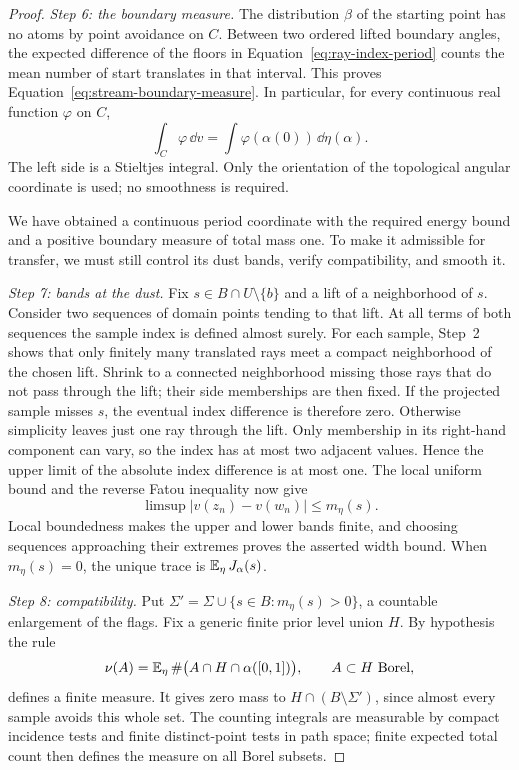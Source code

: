 \begin{proof}
\smallskip\noindent\emph{Step 6: the boundary measure.}
The distribution $\beta$ of the starting point has no atoms by point
avoidance on $C$.  Between two ordered lifted boundary angles, the
expected difference of the floors in
Equation~\eqref{eq:ray-index-period} counts the mean number of start
translates in that interval.  This proves
Equation~\eqref{eq:stream-boundary-measure}.  In particular, for every
continuous real function $\varphi$ on $C$,
\begin{equation}\label{eq:stream-boundary-integral}
 \int_C\varphi\,\dd v
   =\int\varphi(\alpha(0))\,\dd\eta(\alpha).
\end{equation}
The left side is a Stieltjes integral.  Only the orientation of the
topological angular coordinate is used; no smoothness is required.

We have obtained a continuous period coordinate with the required
energy bound and a positive boundary measure of total mass one.  To
make it admissible for transfer, we must still control its dust bands,
verify compatibility, and smooth it.

\smallskip\noindent\emph{Step 7: bands at the dust.}
Fix $s\in B\cap U\setminus\{b\}$ and a lift of a neighborhood of
$s$.  Consider two sequences of domain points tending to that lift.
At all terms of both sequences the sample index is defined almost
surely. For each sample, Step~2 shows that only finitely many translated
rays meet a compact neighborhood of the chosen lift. Shrink to a connected
neighborhood missing those rays that do not pass through the lift; their
side memberships are then fixed. If the projected sample misses $s$,
the eventual index difference is therefore zero. Otherwise simplicity
leaves just one ray through the lift. Only membership in its right-hand
component can vary, so the index has at most two adjacent values. Hence
the upper limit of the absolute index difference is at most one.
The local uniform bound and the reverse Fatou inequality now give
\[
 \limsup |v(z_n)-v(w_n)|\le m_\eta(s).
\]
Local boundedness makes the upper and lower bands finite, and choosing
sequences approaching their extremes proves the asserted width bound.
When $m_\eta(s)=0$, the unique trace is $\operatorname{\mathbb E}_\eta J_\alpha(s)$.

\smallskip\noindent\emph{Step 8: compatibility.}
Put $\Sigma'=\Sigma\cup\{s\in B:m_\eta(s)>0\}$, a countable
enlargement of the flags.  Fix a generic finite prior level union $H$.
By hypothesis the rule
\[
 \nu(A)=\operatorname{\mathbb E}_\eta\#\bigl(A\cap H\cap\alpha([0,1])\bigr),
 \qquad A\subset H\text{ Borel},
\]
defines a finite measure.  It gives zero mass to
$H\cap(B\setminus\Sigma')$, since almost every sample avoids this
whole set.  The counting integrals are measurable by compact incidence
tests and finite distinct-point tests in path space; finite expected
total count then defines the measure on all Borel subsets.


\end{proof}
